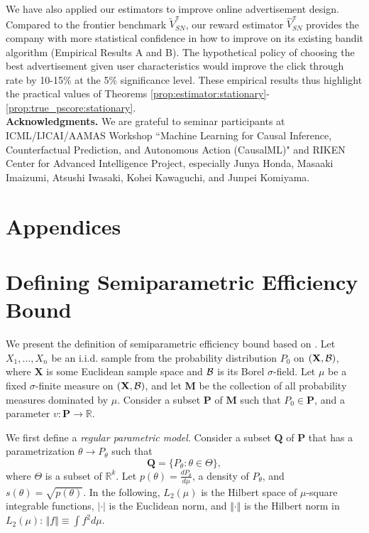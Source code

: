 \documentclass[letterpaper]{article} \usepackage{aaai19}  \usepackage{times}  \usepackage{helvet}  \usepackage{courier}  \usepackage{url}  \usepackage{graphicx}  \frenchspacing  \usepackage{comment}
\newcommand{\citet}[1]
{\citeauthor{#1} \shortcite{#1}}
\begin{document}
We have also applied our estimators to improve online advertisement design. 
Compared to the frontier benchmark $\tilde V^\pi_{SN}$, our reward estimator $\hat V^{\pi}_{SN}$ provides the company with more statistical confidence in how to improve on its existing bandit algorithm (Empirical Results A and B). 
The hypothetical policy of choosing the best advertisement given user characteristics would improve the click through rate by 10-15\% at the 5\% significance level. 
These empirical results thus highlight the practical values of Theorems \ref{prop:estimator:stationary}-\ref{prop:true_pscore:stationary}. \\

\noindent \textbf{Acknowledgments.} 
We are grateful to seminar participants at ICML/IJCAI/AAMAS Workshop ``Machine Learning for Causal Inference, Counterfactual Prediction, and Autonomous Action (CausalML)" and RIKEN Center for Advanced Intelligence Project, especially Junya Honda, Masaaki Imaizumi, Atsushi Iwasaki, Kohei Kawaguchi, and Junpei Komiyama. 






\appendix

\section*{Appendices}

\section{Defining Semiparametric Efficiency Bound}\label{SEB}
We present the definition of semiparametric efficiency bound based on \citet{Bickel1993}.
Let $X_1,...,X_n$ be an i.i.d. sample from the probability distribution $P_0$ on $(\mathbf{X},\cal{B})$, where $\mathbf{X}$ is some Euclidean sample space and $\cal{B}$ is its Borel $\sigma$-field.
Let $\mu$ be a fixed $\sigma$-finite measure on $(\mathbf{X},\cal{B})$, and let $\mathbf{M}$ be the collection of all probability measures dominated by $\mu$.
Consider a subset $\mathbf{P}$ of $\mathbf{M}$ such that $P_0\in \mathbf{P}$, and a parameter $v:\mathbf{P}\rightarrow \mathbb{R}$.

We first define a {\it regular parametric model}.
Consider a subset $\mathbf{Q}$ of $\mathbf{P}$ that has a parametrization $\theta\rightarrow P_\theta$ such that
$$
\mathbf{Q}=\{P_\theta:\theta\in\Theta\},
$$
where $\Theta$ is a subset of $\mathbb{R}^k$.
Let $p(\theta)=\frac{dP_\theta}{d\mu}$, a density of $P_\theta$, and $s(\theta)=\sqrt{p(\theta)}$.
In the following, $L_2(\mu)$ is the Hilbert space of $\mu$-square integrable functions, $|\cdot|$ is the Euclidean norm, and $\Vert\cdot\Vert$ is the Hilbert norm in $L_2(\mu)$: $\Vert f\Vert\equiv \int f^2 d\mu$.
\end{document}
